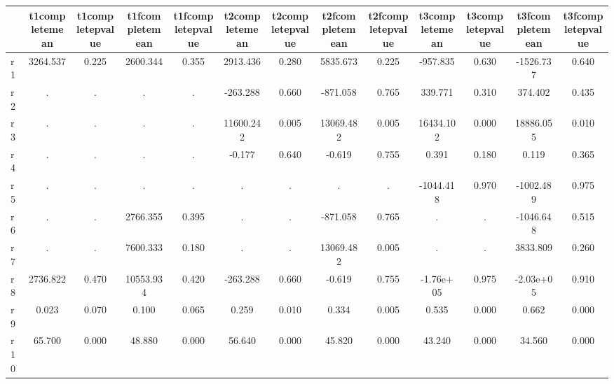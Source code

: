 \begin{table}[htbp]
\begin{tabular}{lcccccccccccc} \hline \hline
 & t1completemean  & t1completepvalue  & t1fcompletemean  & t1fcompletepvalue  & t2completemean  & t2completepvalue  & t2fcompletemean  & t2fcompletepvalue  & t3completemean  & t3completepvalue  & t3fcompletemean  & t3fcompletepvalue  \\  \hline 
r1 &  3264.537 &     0.225 &  2600.344 &     0.355 &  2913.436 &     0.280 &  5835.673 &     0.225 &  -957.835 &     0.630 & -1526.737 &     0.640 \\  
r2 &         . &         . &         . &         . &  -263.288 &     0.660 &  -871.058 &     0.765 &   339.771 &     0.310 &   374.402 &     0.435 \\  
r3 &         . &         . &         . &         . & 11600.242 &     0.005 & 13069.482 &     0.005 & 16434.102 &     0.000 & 18886.055 &     0.010 \\  
r4 &         . &         . &         . &         . &    -0.177 &     0.640 &    -0.619 &     0.755 &     0.391 &     0.180 &     0.119 &     0.365 \\  
r5 &         . &         . &         . &         . &         . &         . &         . &         . & -1044.418 &     0.970 & -1002.489 &     0.975 \\  
r6 &         . &         . &  2766.355 &     0.395 &         . &         . &  -871.058 &     0.765 &         . &         . & -1046.648 &     0.515 \\  
r7 &         . &         . &  7600.333 &     0.180 &         . &         . & 13069.482 &     0.005 &         . &         . &  3833.809 &     0.260 \\  
r8 &  2736.822 &     0.470 & 10553.934 &     0.420 &  -263.288 &     0.660 &    -0.619 &     0.755 & -1.76e+05 &     0.975 & -2.03e+05 &     0.910 \\  
r9 &     0.023 &     0.070 &     0.100 &     0.065 &     0.259 &     0.010 &     0.334 &     0.005 &     0.535 &     0.000 &     0.662 &     0.000 \\  
r10 &    65.700 &     0.000 &    48.880 &     0.000 &    56.640 &     0.000 &    45.820 &     0.000 &    43.240 &     0.000 &    34.560 &     0.000 \\  
\hline \hline \end{tabular}
\end{table}
